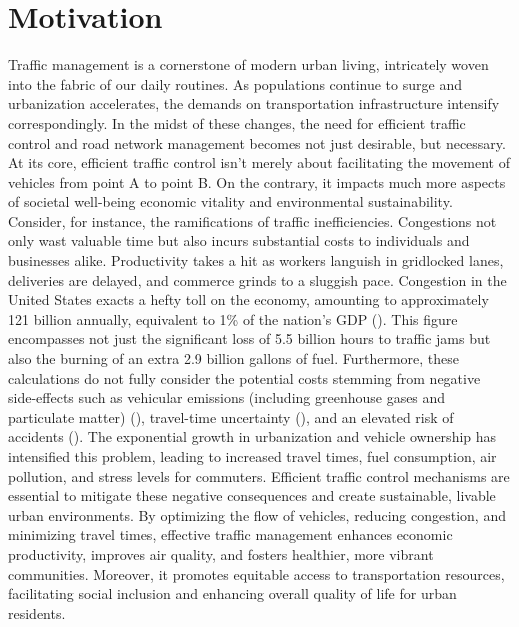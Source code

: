 \chapter{Motivation}

Traffic management is a cornerstone of modern urban living, intricately woven into the fabric of our daily routines. As populations continue to surge and urbanization accelerates, the demands on transportation infrastructure intensify correspondingly. In the midst of these changes, the need for efficient traffic control and road network management becomes not just desirable, but necessary. At its core, efficient traffic control isn't merely about facilitating the movement of vehicles from point A to point B. On the contrary, it impacts much more aspects of societal well-being economic vitality and environmental sustainability. Consider, for instance, the ramifications of traffic inefficiencies. Congestions not only wast valuable time but also incurs substantial costs to individuals and businesses alike. Productivity takes a hit as workers languish in gridlocked lanes, deliveries are delayed, and commerce grinds to a sluggish pace.  Congestion in the United States exacts a hefty toll on the economy, amounting to approximately 121 billion annually, equivalent to 1\% of the nation's GDP (\cite{schrank2012}). This figure encompasses not just the significant loss of 5.5 billion hours to traffic jams but also the burning of an extra 2.9 billion gallons of fuel. Furthermore, these calculations do not fully consider the potential costs stemming from negative side-effects such as vehicular emissions (including greenhouse gases and particulate matter) (\cite{pant2013}), travel-time uncertainty (\cite{carrion2012}), and an elevated risk of accidents (\cite{hennessy1999}). The exponential growth in urbanization and vehicle ownership has intensified this problem, leading to increased travel times, fuel consumption, air pollution, and stress levels for commuters. Efficient traffic control mechanisms are essential to mitigate these negative consequences and create sustainable, livable urban environments. By optimizing the flow of vehicles, reducing congestion, and minimizing travel times, effective traffic management enhances economic productivity, improves air quality, and fosters healthier, more vibrant communities. Moreover, it promotes equitable access to transportation resources, facilitating social inclusion and enhancing overall quality of life for urban residents. \\
